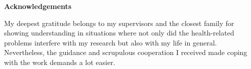 \thispagestyle{plain}

\mbox{}
\vfill

\large
\textbf{Acknowledgements}
\vspace*{1cm}

\normalsize
\noindent My deepest gratitude belongs to my supervisors and the closest family for showing understanding in situations where not only did the health-related problems interfere with my research but also with my life in general. Nevertheless, the guidance and scrupulous cooperation I received made coping with the work demands a lot easier.